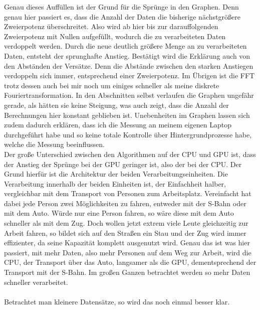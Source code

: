 \documentclass[a4paper,12pt]{article}
\theoremstyle{definition}
\theoremstyle{remark}
\begin{document}
Genau dieses Auffüllen ist der Grund für die Sprünge in den Graphen. Denn genau hier passiert es, dass die Anzahl der Daten die bisherige nächstgrößere 
Zweierpotenz überschreitet. Also wird ab hier bis zur darauffolgenden Zweierpotenz mit Nullen aufgefüllt, wodurch die zu verarbeiteten Daten verdoppelt 
werden. Durch die neue deutlich größere Menge an zu verarbeiteten Daten, entsteht der sprunghafte Anstieg. Bestätigt wird die Erklärung auch von den 
Abständen der Versätze. Denn die Abstände zwischen den starken Anstiegen verdoppeln sich immer, entsprechend einer Zweierpotenz. Im Übrigen ist die FFT 
trotz dessen auch bei mir noch um einiges schneller als meine diskrete Fouriertransformation. In den Abschnitten selbst verlaufen die Graphen ungefähr 
gerade, als hätten sie keine Steigung, was auch zeigt, dass die Anzahl der Berechnungen hier konstant geblieben ist. Unebenheiten im Graphen lassen sich 
zudem dadurch erklären, dass ich die Messung an meinem eigenen Laptop durchgeführt habe und so keine totale Kontrolle über Hintergrundprozesse habe, welche 
die Messung beeinflussen. 
\\
Der große Unterschied zwischen den Algorithmen auf der CPU und GPU ist, dass der Anstieg der Sprünge bei der GPU geringer ist, also der bei der CPU. 
Der Grund hierfür ist die Architektur der beiden Verarbeitungseinheiten. Die Verarbeitung innerhalb der beiden Einheiten ist, der Einfachheit halber, vergleichbar 
mit dem Transport von Personen zum Arbeitsplatz. Vereinfacht hat dabei jede Person zwei Möglichkeiten zu fahren, entweder mit der S-Bahn oder mit dem Auto. Würde 
nur eine Person fahren, so wäre diese mit dem Auto schneller als mit dem Zug. Doch wollen jetzt extrem viele Leute gleichzeitig zur Arbeit fahren, so bildet 
sich auf den Straßen ein Stau und der Zug wird immer effizienter, da seine Kapazität komplett ausgenutzt wird. Genau das ist was hier passiert, mit mehr Daten, 
also mehr Personen auf dem Weg zur Arbeit, wird die CPU, der Transport über das Auto, langsamer als die GPU, dementsprechend der Transport mit der S-Bahn. Im 
großen Ganzen betrachtet werden so mehr Daten schneller verarbeitet. 
\\\\
Betrachtet man kleinere Datensätze, so wird das noch einmal besser klar.
\end{document}
